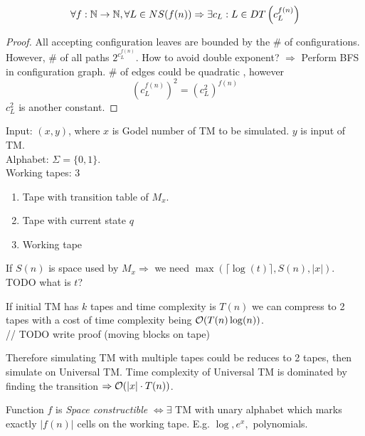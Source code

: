 \begin{theorem}\label{ns_dt}
	\[\forall f:\operatorname{\mathbb{N}} \to \operatorname{\mathbb{N}}, \forall L \in NS(f(n)) \Rightarrow \exists c_L: L \in DT\left(c_L^{f(n)}\right) \]
\end{theorem}
\begin{proof}
	All accepting configuration leaves are bounded by the \# of configurations. However, \# of all paths $2^{c_L^{f(n)}}$.
	How to avoid double exponent? $\Rightarrow$ Perform BFS in configuration graph.
	\# of edges could be quadratic , however
	\[ \left(c_L^{f(n)}\right)^2 = \left(c_L^2\right)^{f(n)} \]
	$c_L^2$ is another constant.
\end{proof}

\begin{definition}[Universal TM]
Input: $(x,y)$, where $x$ is Godel number of TM to be simulated. $y$ is input of TM.\\
Alphabet: $\Sigma = \{ 0, 1 \} $.\\
Working tapes: 3
\begin{enumerate}
	\item Tape with transition table of $M_x$.
	\item Tape with current state $q$
	\item Working tape
\end{enumerate}
If $S(n)$ is space used by $M_x \Rightarrow$ we need $\max(\lceil \log(t) \rceil, S(n), |x|)$.\\
TODO what is $t$?
\end{definition}

\begin{observation}
	If initial TM has $k$ tapes and time complexity is $T(n)$ we can compress to 2 tapes with a cost of time complexity being $\mathcal{O}(T(n) \log(n))$. \\
	// TODO write proof (moving blocks on tape)

	Therefore simulating TM with multiple tapes could be reduces to 2 tapes, then simulate on Universal TM.
	Time complexity of Universal TM is dominated by finding the transition $\Rightarrow \mathcal{O}(|x| \cdot T(n))$.
\end{observation}

\begin{definition}
	Function $f$ is \emph{Space constructible} $\iff \exists$ TM with unary alphabet which marks exactly $|f(n)|$ cells on the working tape. E.g. $\log, e^x,$ polynomials.
\end{definition}

